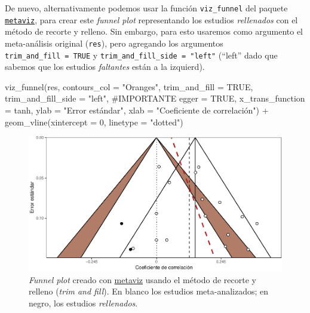 \documentclass[
  bookmarksnumbered]{article}
\newenvironment{Shaded}{\begin{snugshade}}{\end{snugshade}}
\newcommand{\AttributeTok}[1]{\textcolor[rgb]{0.00,0.34,0.68}{#1}}
\newcommand{\CommentTok}[1]{\textcolor[rgb]{0.54,0.53,0.53}{#1}}
\newcommand{\ConstantTok}[1]{\textcolor[rgb]{0.67,0.33,0.00}{#1}}
\newcommand{\DecValTok}[1]{\textcolor[rgb]{0.69,0.50,0.00}{#1}}
\newcommand{\FunctionTok}[1]{\textcolor[rgb]{0.39,0.29,0.61}{#1}}
\newcommand{\NormalTok}[1]{\textcolor[rgb]{0.12,0.11,0.11}{#1}}
\newcommand{\SpecialCharTok}[1]{\textcolor[rgb]{0.24,0.68,0.91}{#1}}
\newcommand{\StringTok}[1]{\textcolor[rgb]{0.75,0.01,0.01}{#1}}
\begin{document}
De nuevo, alternativamente podemos usar la función \texttt{viz\_funnel} del paquete \href{https://cran.r-project.org/web/packages/metaviz/vignettes/metaviz.html}{\texttt{metaviz}}, para crear este \emph{funnel plot} representando los estudios \emph{rellenados} con el método de recorte y relleno. Sin embargo, para esto usaremos como argumento el meta-análisis original (\texttt{res}), pero agregando los argumentos \texttt{trim\_and\_fill\ =\ TRUE} y \texttt{trim\_and\_fill\_side\ =\ "left"} (``left'' dado que sabemos que los estudios \emph{faltantes} están a la izquierd).

\begin{Shaded}
\begin{Highlighting}[]
\FunctionTok{viz\_funnel}\NormalTok{(res, }
           \AttributeTok{contours\_col =} \StringTok{"Oranges"}\NormalTok{,}
           \AttributeTok{trim\_and\_fill =} \ConstantTok{TRUE}\NormalTok{, }
           \AttributeTok{trim\_and\_fill\_side =} \StringTok{"left"}\NormalTok{, }\CommentTok{\#IMPORTANTE}
           \AttributeTok{egger =} \ConstantTok{TRUE}\NormalTok{,}
           \AttributeTok{x\_trans\_function =}\NormalTok{ tanh,}
           \AttributeTok{ylab =} \StringTok{"Error estándar"}\NormalTok{,}
           \AttributeTok{xlab =} \StringTok{"Coeficiente de correlación"}\NormalTok{) }\SpecialCharTok{+}
  \FunctionTok{geom\_vline}\NormalTok{(}\AttributeTok{xintercept =} \DecValTok{0}\NormalTok{, }\AttributeTok{linetype =} \StringTok{"dotted"}\NormalTok{)}
\end{Highlighting}
\end{Shaded}

\begin{figure}
\centering
\includegraphics{Meta-analysis_files/figure-latex/tf-plot2-1.pdf}
\caption{\label{fig:tf-plot2}\emph{Funnel plot} creado con \href{https://cran.r-project.org/web/packages/metaviz/vignettes/metaviz.html}{metaviz} usando el método de recorte y relleno (\emph{trim and fill}). En blanco los estudios meta-analizados; en negro, los estudios \emph{rellenados}.}
\end{figure}
\end{document}

